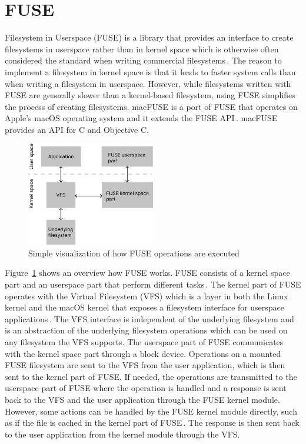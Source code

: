 \section{FUSE}
Filesystem in Userspace (FUSE) is a library that provides an interface to create filesystems in userspace rather than in kernel space which is otherwise often considered the standard when writing commercial filesystems\,\cite{Libfuse2021}. The reason to implement a filesystem in kernel space is that it leads to faster system calls than when writing a filesystem in userspace. However, while filesystems written with FUSE are generally slower than a kernel-based filesystem, using FUSE simplifies the process of creating filesystems. macFUSE is a port of FUSE that operates on Apple's macOS operating system and it extends the FUSE API\,\cite{HomeMacFUSE}. macFUSE provides an API for C and Objective C.

\begin{figure}[!ht]
	\begin{center}
	  \includegraphics[width=0.5\textwidth]{figures/fuse_description.png}
	\end{center}
	\caption{Simple visualization of how FUSE operations are executed}
	\label{fig:fuse_desc}
\end{figure}

Figure~\ref{fig:fuse_desc} shows an overview how FUSE works. FUSE consists of a kernel space part and an userspace part that perform different tasks\,\cite{vangoorFUSENotFUSE2017}. The kernel part of FUSE operates with the Virtual Filesystem (\gls{VFS}) which is a layer in both the Linux kernel and the macOS kernel that exposes a filesystem interface for userspace applications\,\cite{goochOverviewLinuxVirtual, singhMacOSInternals2006}. The VFS interface is independent of the underlying filesystem and is an abstraction of the underlying filesystem operations which can be used on any filesystem the VFS supports. The userspace part of FUSE communicates with the kernel space part through a block device. Operations on a mounted FUSE filesystem are sent to the VFS from the user application, which is then sent to the kernel part of FUSE. If needed, the operations are transmitted to the userspace part of FUSE where the operation is handled and a response is sent back to the VFS and the user application through the FUSE kernel module. However, some actions can be handled by the FUSE kernel module directly, such as if the file is cached in the kernel part of FUSE\,\cite{vangoorFUSENotFUSE2017}. The response is then sent back to the user application from the kernel module through the VFS.